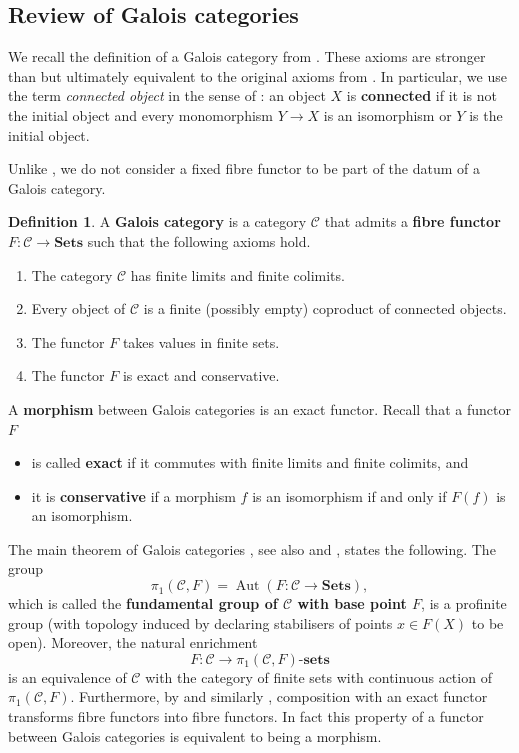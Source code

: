 \documentclass[a4paper,twoside,11pt,reqno]{amsart}
\newcommand{\cC}{{\mathcal C}}
\DeclareMathOperator{\Aut}{Aut}
\newcommand{\cat}[1]{\mathbf{#1}}
\newcommand{\sets}{\cat{sets}} %
\newcommand{\Sets}{\cat{Sets}}
\newcommand{\stacks}[2][Tag]{\cite[\href{https://stacks.math.columbia.edu/tag/#2}{#1~#2}]{StacksProject}}
\theoremstyle{definition}
\newtheorem{defi}[thm]{Definition}
\numberwithin{equation}{subsection}
\begin{document}
\subsection{Review of Galois categories}
\label{sec:Gal cats}

We recall the definition of a Galois category from 
\stacks[Definition]{0BMY}.  These axioms are stronger than  but ultimately equivalent to the original axioms from \cite[V, \S4]{SGA1}. In particular, we use the term \emph{connected object} in the sense of \stacks{0BMY}: an object $X$ is \textbf{connected}  if it is not the initial object and every monomorphism $Y \to X$ is an isomorphism or $Y$ is the initial object. 

Unlike \stacks{0BMY}, we do not consider a fixed fibre functor to be part of the datum of a Galois category.

\begin{defi}
    \label{defi:Gal cat}
    A \textbf{Galois category} is a category $\cC$ that admits a \textbf{fibre functor} $F \colon \cC \to \Sets$ such that the following axioms hold. 
    \begin{enumerate}[(G\arabic*)]
        \item 
        The category $\cC$ has finite limits and finite colimits.
        \item 
        Every object of $\cC$ is a finite (possibly empty) coproduct of connected objects. 
        \item 
        The functor $F$ takes values in finite sets.
        \item 
        The functor $F$ is exact 
        and conservative. 
    \end{enumerate}
    A \textbf{morphism} between Galois categories is an exact functor.    
    Recall that a functor $F$
    \begin{itemize}
        \item 
        is called \textbf{exact} if it commutes with finite limits and finite colimits, and 
        \item 
        it is \textbf{conservative} if a morphism $f$ is an isomorphism if and only if $F(f)$ is an isomorphism. 
    \end{itemize} 
\end{defi}

The main theorem of Galois categories \cite[V~Th\'eor\`eme 4.1]{SGA1}, see also \stacks{0BMR} and \stacks{0BN4}, states the following. The group
\[
    \pi_1(\cC,F) =  \Aut(F \colon \cC \to \Sets),
\]
which is called the \textbf{fundamental group of $\cC$ with base point $F$}, 
is a profinite group (with topology induced by declaring stabilisers of points $x \in F(X)$ to be open). Moreover, the natural enrichment
\[
    F \colon \cC \longrightarrow \pi_1(\cC,F)\text{-}\sets
\]
is an equivalence of $\cC$ with the category of finite sets with continuous action of $\pi_1(\cC,F)$. Furthermore, by \cite[V Proposition~6.1]{SGA1} and similarly \stacks{0BN5}, composition with an exact functor transforms fibre functors into fibre functors. In fact this property of a functor between Galois categories is equivalent to being a morphism.
\end{document}
